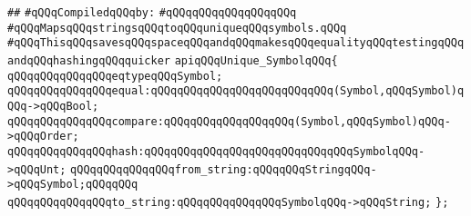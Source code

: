 \label{src/lib/compiler/back/low/tools/line-number-db/symbol.api}
\verb|##|\newline
\newline
\verb|#qQQqCompiledqQQqby:|\newline
\verb|#qQQqqQQqqQQqqQQqqQQq|\newline
\newline
\verb|#qQQqMapsqQQqstringsqQQqtoqQQquniqueqQQqsymbols.qQQq|\newline
\verb|#qQQqThisqQQqsavesqQQqspaceqQQqandqQQqmakesqQQqequalityqQQqtestingqQQqandqQQqhashingqQQqquicker|\newline
\newline
\verb|apiqQQqUnique_SymbolqQQq{|\newline
\newline
\verb|qQQqqQQqqQQqqQQqeqtypeqQQqSymbol;|\newline
\newline
\verb|qQQqqQQqqQQqqQQqequal:qQQqqQQqqQQqqQQqqQQqqQQqqQQq(Symbol,qQQqSymbol)qQQq->qQQqBool;|\newline
\verb|qQQqqQQqqQQqqQQqcompare:qQQqqQQqqQQqqQQqqQQq(Symbol,qQQqSymbol)qQQq->qQQqOrder;|\newline
\verb|qQQqqQQqqQQqqQQqhash:qQQqqQQqqQQqqQQqqQQqqQQqqQQqqQQqSymbolqQQq->qQQqUnt;|\newline
\verb|qQQqqQQqqQQqqQQqfrom_string:qQQqqQQqStringqQQq->qQQqSymbol;qQQqqQQq|\newline
\verb|qQQqqQQqqQQqqQQqto_string:qQQqqQQqqQQqqQQqSymbolqQQq->qQQqString;|\newline
\verb|};|\newline

